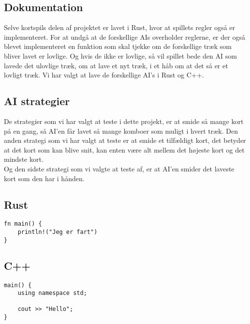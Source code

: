 \documentclass[a4paper, 12pt]{article}
\begin{document}
\begin{multicols}{2}
\vfill
\pagebreak

\section{Dokumentation}

Selve kortspils delen af projektet er lavet i Rust, hvor at spillets regler også er implementeret. For at undgå at de forskellige AIs overholder reglerne, er der også blevet implementeret en funktion som skal tjekke om de forskellige træk som bliver lavet er lovlige. Og hvis de ikke er lovlige, så vil spillet bede den AI som lavede det ulovlige træk, om at lave et nyt træk, i et håb om at det så er et lovligt træk. Vi har valgt at lave de forskellige AI's i Rust og C++.

\vfill

\subsection{AI strategier}
De strategier som vi har valgt at teste i dette projekt, er at smide så mange kort på en gang, så AI'en får lavet så mange komboer som muligt i hvert træk. Den anden strategi som vi har valgt at teste er at smide et tilfældigt kort, det betyder at det kort som kan blive snit, kan enten være alt mellem det højeste kort og det mindste kort. \\
Og den sidste strategi som vi valgte at teste af, er at AI'en smider det laveste kort som den har i hånden. 

\vfill
\pagebreak
\end{multicols}

\subsection{Rust}

\begin{verbatim}
fn main() {
	println!("Jeg er fart")
}
\end{verbatim}

\subsection{C++}

\begin{verbatim}
main() {
	using namespace std;

	cout >> "Hello";
}
\end{verbatim}

\vfill
\pagebreak
\end{document}
